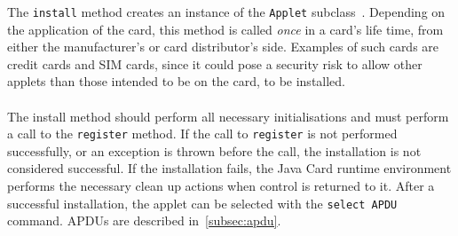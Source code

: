 The \texttt{install} method creates an instance of the \texttt{Applet} subclass~\cite[p. 65]{java_card_spec}. Depending on the application of the card, this method is called \textit{once} in a card's life time, from either the manufacturer's or card distributor's side. Examples of such cards are credit cards and SIM cards, since it could pose a security risk to allow other applets than those intended to be on the card, to be installed.\\\\
The install method should perform all necessary initialisations and must perform a call to the \texttt{register} method. If the call to \texttt{register} is not performed successfully, or an exception is thrown before the call, the installation is not considered successful. If the installation fails, the Java Card runtime environment performs the necessary clean up actions when control is returned to it. After a successful installation, the applet can be selected with the \texttt{select APDU} command. APDUs are described in~\cref{subsec:apdu}.
